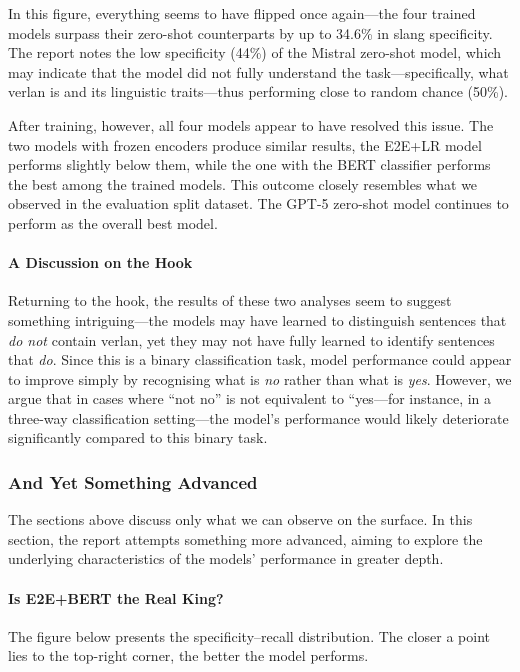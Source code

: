 \documentclass[12pt]{article}
\begin{document}
In this figure, everything seems to have flipped once again\;---\;the four trained models surpass their zero-shot counterparts by up to 34.6\% in slang specificity. 
The report notes the low specificity (44\%) of the Mistral zero-shot model, which may indicate that the model did not fully understand the task\;---\;specifically, what verlan is and its linguistic traits\;---\;thus performing close to random chance (50\%).

After training, however, all four models appear to have resolved this issue. 
The two models with frozen encoders produce similar results, the E2E+LR model performs slightly below them, while the one with the BERT classifier performs the best among the trained models. 
This outcome closely resembles what we observed in the evaluation split dataset. 
The GPT-5 zero-shot model continues to perform as the overall best model.

\paragraph{A Discussion on the Hook}
Returning to the hook, the results of these two analyses seem to suggest something intriguing\;---\;the models may have learned to distinguish sentences that \textit{do not} contain verlan, yet they may not have fully learned to identify sentences that \textit{do}. 
Since this is a binary classification task, model performance could appear to improve simply by recognising what is \textit{no} rather than what is \textit{yes}. 
However, we argue that in cases where “not no” is not equivalent to “yes\;---\;for instance, in a three-way classification setting\;---\;the model's performance would likely deteriorate significantly compared to this binary task.

\subsubsection{And Yet Something Advanced}

The sections above discuss only what we can observe on the surface. 
In this section, the report attempts something more advanced, aiming to explore the underlying characteristics of the models' performance in greater depth.

\paragraph{Is E2E+BERT the Real King?}

The figure below presents the specificity--recall distribution. 
The closer a point lies to the top-right corner, the better the model performs.
\end{document}

